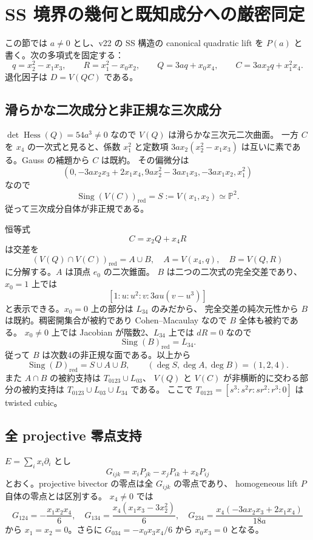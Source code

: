 \section{SS 境界の幾何と既知成分への厳密同定}

この節では $a\ne0$ とし、v22 の SS 構造の canonical quadratic lift を
$P(a)$ と書く。次の多項式を固定する：
\[
 q=x_2^2-x_1x_3,\qquad R=x_1^2-x_0x_2,\qquad
 Q=3aq+x_0x_4,\qquad C=3ax_2q+x_1^2x_4.
\]
退化因子は $D=V(QC)$ である。

\subsection{滑らかな二次成分と非正規な三次成分}

$\det\operatorname{Hess}(Q)=54a^3\ne0$ なので $V(Q)$ は滑らかな三次元二次曲面。
一方 $C$ を $x_4$ の一次式と見ると、係数 $x_1^2$ と定数項
$3ax_2(x_2^2-x_1x_3)$ は互いに素である。Gauss の補題から $C$ は既約。
その偏微分は
\[
 \left(0,-3ax_2x_3+2x_1x_4,9ax_2^2-3ax_1x_3,
 -3ax_1x_2,x_1^2\right)
\]
なので
\[
 \operatorname{Sing}(V(C))_{\mathrm{red}}
 =S:=V(x_1,x_2)\simeq\mathbb P^2.
\]
従って三次成分自体が非正規である。

恒等式
\[
 \boxed{C=x_2Q+x_4R}
\]
は交差を
\[
 (V(Q)\cap V(C))_{\mathrm{red}}=A\cup B,
 \quad A=V(x_4,q),\quad B=V(Q,R)
\]
に分解する。$A$ は頂点 $e_0$ の二次錐面。
$B$ は二つの二次式の完全交差であり、$x_0=1$ 上では
\[
 [1:u:u^2:v:3au(v-u^3)]
\]
と表示できる。$x_0=0$ 上の部分は $L_{34}$ のみだから、
完全交差の純次元性から $B$ は既約。稠密開集合が被約であり
Cohen--Macaulay なので $B$ 全体も被約である。
$x_0\ne0$ 上では Jacobian が階数2、$L_{34}$ 上では $dR=0$ なので
\[
 \operatorname{Sing}(B)_{\mathrm{red}}=L_{34}.
\]
従って $B$ は次数4の非正規な面である。以上から
\[
 \operatorname{Sing}(D)_{\mathrm{red}}=S\cup A\cup B,
 \qquad (\deg S,\deg A,\deg B)=(1,2,4).
\]
また $A\cap B$ の被約支持は $T_{0123}\cup L_{03}$、
$V(Q)$ と $V(C)$ が非横断的に交わる部分の被約支持は
$T_{0123}\cup L_{03}\cup L_{34}$ である。
ここで
$T_{0123}=[s^3:s^2r:sr^2:r^3:0]$ は twisted cubic。

\subsection{全 projective 零点支持}

$E=\sum_i x_i\partial_i$ とし
\[
 G_{ijk}=x_iP_{jk}-x_jP_{ik}+x_kP_{ij}
\]
とおく。projective bivector の零点は全 $G_{ijk}$ の零点であり、
homogeneous lift $P$ 自体の零点とは区別する。
$x_4\ne0$ では
\[
 G_{124}=-\frac{x_1x_2x_4}{6},\quad
 G_{134}=\frac{x_4(x_1x_3-3x_2^2)}6,\quad
 G_{234}=\frac{x_4(-3ax_2x_3+2x_1x_4)}{18a}
\]
から $x_1=x_2=0$。さらに
$G_{034}=-x_0x_3x_4/6$ から $x_0x_3=0$ となる。

